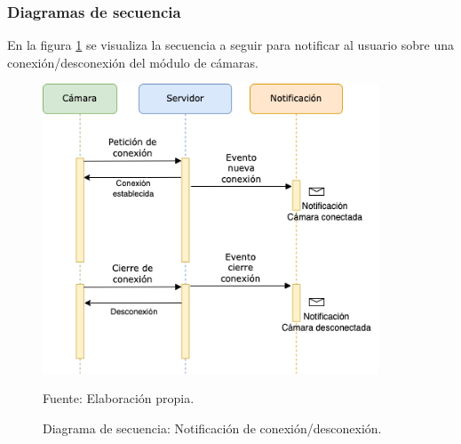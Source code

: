 \subsubsection{Diagramas de secuencia}
En la figura \ref{fig:diag_sec_notif_conn} se visualiza la secuencia a seguir para notificar al usuario sobre una conexión/desconexión del módulo de cámaras.\\

\begin{figure}[H]
    \begin{center}
        \includegraphics[width=10cm]{img/capitulo_4/camera_notif.png}
    \end{center}
    \begin{center}
        \caption{Diagrama de secuencia: Notificación de conexión/desconexión.}
        Fuente: Elaboración propia.
        \label{fig:diag_sec_notif_conn}
    \end{center}
\end{figure}

